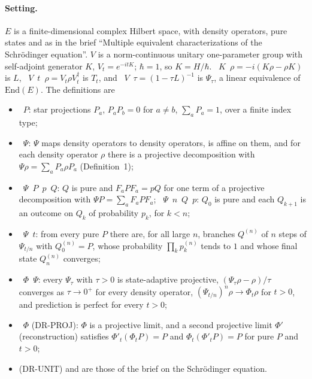 \documentclass[11pt]{article}
\begin{document}
\paragraph{Setting.} $E$ is a finite-dimensional complex Hilbert space, with density operators,
pure states and  as in the brief ``Multiple equivalent characterizations
of the Schr\"odinger equation''. $V$ is a norm-continuous unitary one-parameter group with
self-adjoint generator $K$, $V_t = e^{-itK}$; $\hbar = 1$, so $K = H/\hbar$.
~$K$~$\rho = -i(K\rho - \rho K)$ is $L$,
~$V$~$t$~$\rho = V_t\rho V_t^\dagger$ is $T_t$, and
~$V$~$\tau = (1 - \tau L)^{-1}$ is $\Psi_\tau$, a linear equivalence of
$\mathrm{End}(E)$. The definitions are
\begin{itemize}
\item {}~$P$: star projections $P_a$, $P_aP_b = 0$ for
  $a \ne b$, $\sum_a P_a = 1$, over a finite index type;
\item {}~$\Psi$: $\Psi$ maps density operators to density
  operators, is affine on them, and for each density operator $\rho$ there is a projective
  decomposition with $\Psi\rho = \sum_a P_a\rho P_a$ (Definition~1);
\item {}~$\Psi$~$P$~$p$~$Q$: $Q$ is pure and $F_aPF_a = pQ$ for one term of a
  projective decomposition with $\Psi P = \sum_a F_aPF_a$;
  ~$\Psi$~$n$~$Q$~$p$: $Q_0$ is pure and each $Q_{k+1}$ is an outcome on $Q_k$
  of probability $p_k$, for $k < n$;
\item {}~$\Psi$~$t$: from every pure $P$ there are, for all large $n$,
  branches $Q^{(n)}$ of $n$ steps of $\Psi_{t/n}$ with $Q^{(n)}_0 = P$, whose probability
  $\prod_k p^{(n)}_k$ tends to $1$ and whose final state $Q^{(n)}_n$ converges;
\item {}~$\Phi$~$\Psi$: every $\Psi_\tau$ with $\tau > 0$ is
  state-adaptive projective, $(\Psi_\tau\rho - \rho)/\tau$ converges as $\tau \to 0^+$ for every
  density operator, $(\Psi_{t/n})^n\rho \to \Phi_t\rho$ for $t > 0$, and prediction is perfect
  for every $t > 0$;
\item {}~$\Phi$ (DR-PROJ): $\Phi$ is a projective limit, and a second projective limit
  $\Phi'$ (reconstruction) satisfies $\Phi'_t(\Phi_tP) = P$ and $\Phi_t(\Phi'_tP) = P$ for pure
  $P$ and $t > 0$;
\item {} (DR-UNIT) and  are those of the brief on the
  Schr\"odinger equation.
\end{itemize}
\end{document}

